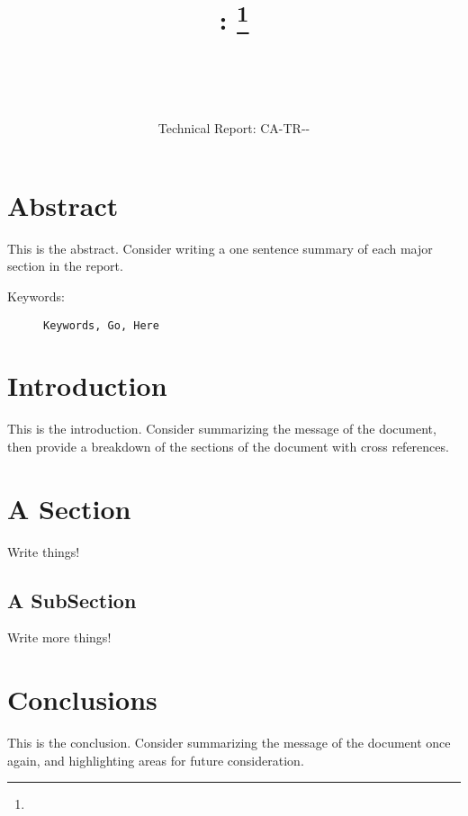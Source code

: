 \documentclass[a4paper, 11pt]{article}
\title{{\myreporttitle}: {\myreportsubtitle}\footnote{\myreportlicense}}
\author{\myreportauthor\\{\myreportemail}\\\small\myreportproject}
\date{\myreportfulldate\\{\small{Technical Report: CA-TR-{\myreportdate}-\myreportversion}}}
\begin{document}
\maketitle

\section*{Abstract} 
This is the abstract. Consider writing a one sentence summary of each major section in the report.

\begin{description}
	\item[Keywords:] {\small\texttt{Keywords, Go, Here}}
\end{description} 

\section{Introduction}
\label{sec:introduction}
This is the introduction. Consider summarizing the message of the document, then provide a breakdown of the sections of the document with cross references.

\section{A Section}
\label{sec:a_section}
Write things!

\subsection{A SubSection}
Write more things!

\section{Conclusions}
\label{sec:conclusions}
This is the conclusion. Consider summarizing the message of the document once again, and highlighting areas for future consideration.



\end{document}
